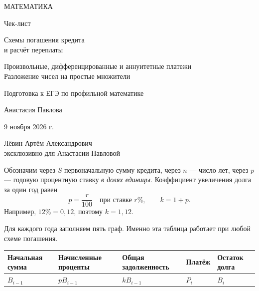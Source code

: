 \documentclass[a4paper,11pt]{article}
\newcommand{\topic}[1]{\needspace{8\baselineskip}\vspace{6pt}{\Large\color{darkaccent}\bfseries #1}\par\vspace{3pt}}
\begin{document}
\thispagestyle{empty}
\begin{center}
\vspace*{19mm}
{\large\color{accent} МАТЕМАТИКА}\par
\vspace{25mm}
{\Huge\color{ink} Чек-лист}\par
\vspace{13mm}
{\LARGE\color{accent} Схемы погашения кредита\\[3mm] и расчёт переплаты}\par
\vspace{13mm}
{\normalsize Произвольные, дифференцированные и аннуитетные платежи\\[2mm]
Разложение чисел на простые множители}\par
\vspace{23mm}
{\normalsize Подготовка к ЕГЭ по профильной математике}\par
\vfill
{\large Анастасия Павлова}\par
\vspace{11mm}
{9 ноября 2026 г.}\par
\vspace{25mm}
{\small Лёвин Артём Александрович\\[1mm]
эксклюзивно для Анастасии Павловой}\par
\vspace{17mm}
\end{center}
\clearpage

\topic{1. Общая схема кредита}

Обозначим через $S$ первоначальную сумму кредита, через $n$ --- число лет, через
$p$ --- годовую процентную ставку \emph{в долях единицы}. Коэффициент увеличения долга
за один год равен
\[
 p=\frac{r}{100}\quad\text{при ставке }r\%,\qquad k=1+p.
\]
Например, $12\%=0{,}12$, поэтому $k=1{,}12$.

Для каждого года заполняем пять граф. Именно эта таблица работает при любой
схеме погашения.

\begin{center}
\small
\renewcommand{\arraystretch}{1.4}
\begin{tabularx}{\linewidth}{>{\raggedright\arraybackslash}X >{\centering\arraybackslash}X >{\centering\arraybackslash}X >{\centering\arraybackslash}X >{\centering\arraybackslash}X}
\toprule
Начальная сумма & Начисленные проценты & Общая задолженность & Платёж & Остаток долга \\
\midrule
$B_{i-1}$ & $pB_{i-1}$ & $kB_{i-1}$ & $P_i$ & $B_i$ \\
\bottomrule
\end{tabularx}
\end{center}
\end{document}
